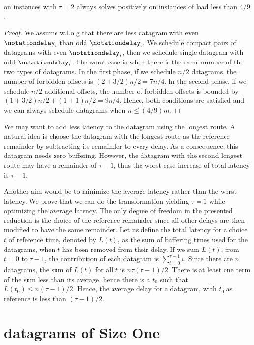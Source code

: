 \begin{theorem}
\compactpair on instances with $\tau =2$ always solves \pma positively on instances of load less than $4/9$.
\end{theorem}
\begin{proof}
We assume w.l.o.g that there are less datagram with even $\notationdelay_i$ than odd $\notationdelay_i$.
We schedule compact pairs of datagrams with even $\notationdelay_i$, then we schedule single datagram with odd $\notationdelay_i$. The worst case is when there is the same number of the two types of datagrams. In the first phase, if we schedule
 $n/2$ datagrams, the number of forbidden offsets is $(2 + 3/2)n/2 = 7n/4$. In the second phase,
 if we schedule $n/2$ additional offsets, the number of forbidden offsets is bounded by 
$ (1 + 3/2) n/2  + (1 + 1)n/2 = 9n/4$. 
Hence, both conditions are satisfied and we can always schedule datagrams when $n \leq (4/9)m$.
\end{proof}



We may want to add less latency to the datagram using the longest route. A natural idea is choose the datagram with the longest route as the reference remainder by subtracting its remainder to every delay.
As a consequence, this datagram needs zero buffering. However, the datagram with the second longest route may have a remainder of $\tau -1$, thus the worst case increase of total latency is $\tau -1$. 

Another aim would be to minimize the average latency rather than the worst latency.
We prove that we can do the transformation yielding $\tau=1$ while optimizing the average latency. 
 The only degree of freedom in the presented reduction is the choice of the reference remainder since all other delays are then modified to have the same remainder. Let us define the total latency for a choice $t$ of reference time, denoted by $L(t)$, as the sum of buffering times used for the datagrams, when $t$ has been removed from their delay.
If we sum $L(t)$, from $t=0$ to $\tau-1$, the contribution of each datagram is $\sum_{i=0}^{\tau-1} i$. Since there are $n$ datagrams, the sum of $L(t)$ for all $t$ is $n \tau (\tau-1)/2$. There is at least one term of the sum less than its average,
hence there is a $t_0$ such that $L(t_0) \leq n (\tau-1)/2$. Hence, the average delay for a datagram, with $t_0$ as reference is less than $(\tau -1)/2$.


\section{datagrams of Size One} \label{sec:small}

